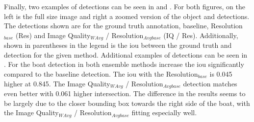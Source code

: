 Finally, two examples of detections can be seen in  and . For both figures, on the left is the full size image and right a zoomed version of the object and detections. The detections shown are for the ground truth annotation, baseline, Resolution$_{base}$ (Res) and Image Quality$_{WAvg}$ / Resolution$_{Avgbase}$ (IQ / Res). Additionally, shown in parentheses in the legend is the \gls{iou} between the ground truth and detection for the given method. Additional examples of detections can be seen in .
For the boat detection in  both ensemble methods increase the \gls{iou} significantly compared to the baseline detection. The \gls{iou} with the Resolution$_{base}$ is 0.045 higher at 0.845. The Image Quality$_{WAvg}$ / Resolution$_{Avgbase}$ detection matches even better with 0.061 higher intersection. The difference in the results seems to be largely due to the closer bounding box towards the right side of the boat, with the Image Quality$_{WAvg}$ / Resolution$_{Avgbase}$ fitting especially well.



